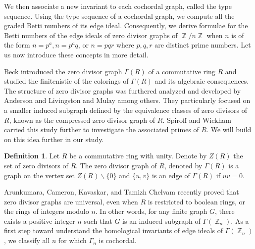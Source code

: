 \documentclass[12pt,amscd]{amsart}
\theoremstyle{definition}
\newtheorem{defn}[thm]{Definition}
\numberwithin{equation}{section}
\DeclareMathOperator{\ZZ}{\mathbb {Z}}
\begin{document}
We then associate a new invariant to each cochordal graph, called the type sequence. Using the type sequence of a cochordal graph, we compute all the graded Betti numbers of its edge ideal. Consequently, we derive formulae for the Betti numbers of the edge ideals of zero divisor graphs of $\ZZ/n\ZZ$ when $n$ is of the form $n = p^a, n = p^a q$, or $n = pqr$ where $p,q,r$ are distinct prime numbers. Let us now introduce these concepts in more detail.

Beck \cite{B} introduced the zero divisor graph $\Gamma (R)$ of a commutative ring $R$ and studied the finitenistic of the colorings of $\Gamma(R)$ and its algebraic consequences. The structure of zero divisor graphs was furthered analyzed and developed by Anderson and Livingston \cite{AL} and Mulay \cite{M} among others. They particularly focused on a smaller induced subgraph defined by the equivalence classes of zero divisors of $R$, known as the compressed zero divisor graph of $R$. Spiroff and Wickham \cite{SW} carried this study further to investigate the associated primes of $R$. We will build on this idea  further in our study.

\begin{defn}
    Let $R$ be a commutative ring with unity. Denote by $Z(R)$ the set of zero divisors of $R$. The zero divisor graph of $R$, denoted by $\Gamma(R)$ is a graph on the vertex set $Z(R) \backslash \{0\}$ and $\{u,v\}$ is an edge of $\Gamma(R)$ if $uv = 0$.
\end{defn}

Arunkumara, Cameron, Kavaskar, and Tamizh Chelvam \cite{ACKT} recently proved that zero divisor graphs are universal, even when $R$ is restricted to boolean rings, or the rings of integers modulo $n$. In other words, for any finite graph $G$, there exists a positive integer $n$ such that $G$ is an induced subgraph of $\Gamma(\ZZ_n)$. As a first step toward understand the homological invariants of edge ideals of $\Gamma(\ZZ_n)$, we classify all $n$ for which $\Gamma_n$ is cochordal. 
\end{document}

